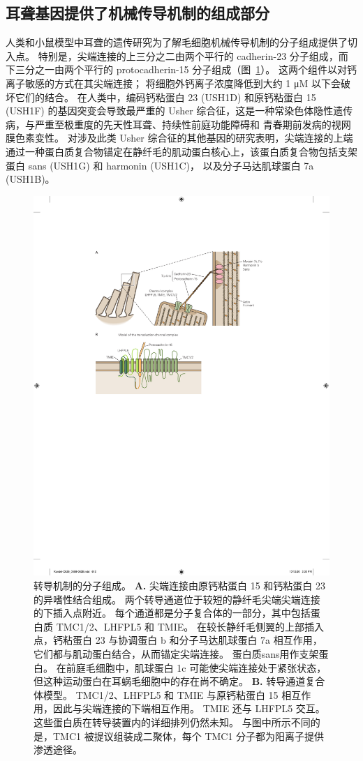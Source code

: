\subsection{耳聋基因提供了机械传导机制的组成部分}

人类和小鼠模型中耳聋的遗传研究为了解毛细胞机械传导机制的分子组成提供了切入点。
特别是，尖端连接的上三分之二由两个平行的 cadherin-23 分子组成，而下三分之一由两个平行的 protocadherin-15 分子组成（图~\ref{fig:26_10}）。
这两个组件以对钙离子敏感的方式在其尖端连接；
将细胞外钙离子浓度降低到大约 1 μM 以下会破坏它们的结合。
在人类中，编码钙粘蛋白 23 (USH1D) 和原钙粘蛋白 15 (USH1F) 的基因突变会导致最严重的 Usher 综合征，这是一种常染色体隐性遗传病，与严重至极重度的先天性耳聋、持续性前庭功能障碍和 青春期前发病的视网膜色素变性。
对涉及此类 Usher 综合征的其他基因的研究表明，尖端连接的上端通过一种蛋白质复合物锚定在静纤毛的肌动蛋白核心上，该蛋白质复合物包括支架蛋白 sans (USH1G) 和 harmonin (USH1C)， 以及分子马达肌球蛋白 7a (USH1B)。


\begin{figure}[htbp]
	\centering
	\includegraphics[width=0.7\linewidth]{chap26/fig_26_10}
	\caption{转导机制的分子组成。
		\textbf{A.} 尖端连接由原钙粘蛋白 15 和钙粘蛋白 23 的异嗜性结合组成。
		两个转导通道位于较短的静纤毛尖端尖端连接的下插入点附近。
		每个通道都是分子复合体的一部分，其中包括蛋白质 TMC1/2、LHFPL5 和 TMIE。
		在较长静纤毛侧翼的上部插入点，钙粘蛋白 23 与协调蛋白 b 和分子马达肌球蛋白 7a 相互作用，它们都与肌动蛋白结合，从而锚定尖端连接。
		蛋白质sans用作支架蛋白。
		在前庭毛细胞中，肌球蛋白 1c 可能使尖端连接处于紧张状态，但这种运动蛋白在耳蜗毛细胞中的存在尚不确定。
		\textbf{B.} 转导通道复合体模型。
		TMC1/2、LHFPL5 和 TMIE 与原钙粘蛋白 15 相互作用，因此与尖端连接的下端相互作用。
		TMIE 还与 LHFPL5 交互。
		这些蛋白质在转导装置内的详细排列仍然未知。
		与图中所示不同的是，TMC1 被提议组装成二聚体，每个 TMC1 分子都为阳离子提供渗透途径\cite{wu2016molecular,pan2018tmc1}。}
	\label{fig:26_10}
\end{figure}


